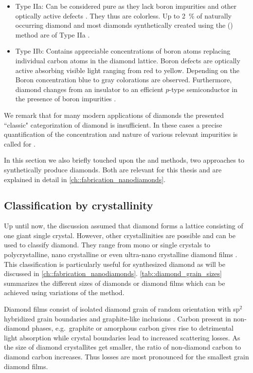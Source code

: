    \begin{itemize}
      \item Type IIa: Can be considered pure as they lack boron impurities and other optically active defects \cite{Walker1979}. They thus are colorless. Up to \SI{2}{\percent} of naturally occurring diamond and most diamonds synthetically created using the \cvd (\CVD) method are of Type IIa \cite{Zaitsev2001}.
      \item Type IIb: Contains appreciable concentrations of boron atoms replacing individual carbon atoms in the diamond lattice. Boron defects are optically active absorbing visible light ranging from red to yellow. Depending on the Boron concentration blue to gray colorations are observed. Furthermore, diamond changes from an insulator to an efficient $p$-type semiconductor in the presence of boron impurities \cite{Massarani1978}.
    \end{itemize}

    We remark that for many modern applications of diamonds the presented ``classic" categorization of diamond is insufficient. In these cases a precise quantification of the concentration and nature of various relevant impurities is called for \cite{Markham2011, Balasubramanian2009}.

    In this section we also briefly touched upon the \CVD and \HPHT methods, two approaches to synthetically produce diamonds. Both are relevant for this thesis and are explained in detail in \cref{ch::fabrication_nanodiamonds}.

  \subsection{Classification by crystallinity}

    Up until now, the discussion assumed that diamond forms a lattice consisting of one giant single crystal. However, other crystallinities are possible and can be used to classify diamond.
    They range from mono or single crystals to polycrystalline, nano crystalline or even ultra-nano crystalline diamond films \cite{May2000}. This classification is particularly useful for synthesized diamond as will be discussed in \cref{ch::fabrication_nanodiamonds}. \cref{tab::diamond_grain_sizes} summarizes the different sizes of diamonds or diamond films which can be achieved using variations of the \CVD method.

    Diamond films consist of isolated diamond grain of random orientation with sp$^2$ hybridized grain boundaries and graphite-like inclusions \cite{Riedrich-moller2014}. Carbon present in non-diamond phases, e.g.\ graphite or amorphous carbon gives rise to detrimental light absorption while crystal boundaries lead to increased scattering losses. As the size of diamond crystallites get smaller, the ratio of non-diamond carbon to diamond carbon increases. Thus losses are most pronounced for the smallest grain diamond films.

